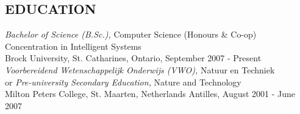 \documentclass[margin]{res}
\begin{document}
\begin{resume}




\section{EDUCATION}
  {\sl Bachelor of Science (B.Sc.),} Computer Science (Honours \& Co-op) \\
  Concentration in Intelligent Systems \\
  Brock University, St. Catharines, Ontario, 
  \hfill September 2007 - Present \\
                
  {\sl Voorbereidend Wetenschappelijk Onderwijs (VWO),} Natuur en Techniek \\
  or {\sl Pre-university Secondary Education,} Nature and Technology \\
  Milton Peters College, St. Maarten, Netherlands Antilles, 
  \hfill August 2001 - June 2007 \\



\end{resume}
\end{document}
